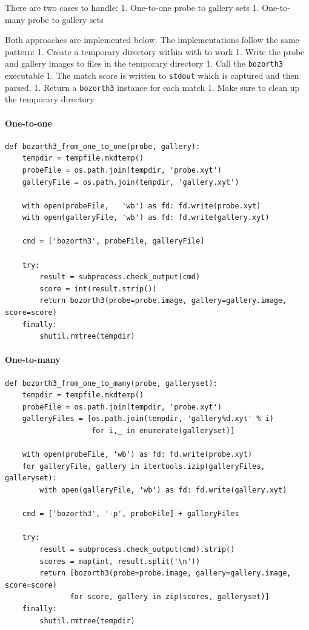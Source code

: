 There are two cases to handle: 1. One-to-one probe to gallery sets 1.
One-to-many probe to gallery sets

Both approaches are implemented below. The implementations follow the
same pattern: 1. Create a temporary directory within with to work 1.
Write the probe and gallery images to files in the temporary directory
1. Call the \texttt{bozorth3} executable 1. The match score is written
to \texttt{stdout} which is captured and then parsed. 1. Return a
\texttt{bozorth3} instance for each match 1. Make sure to clean up the
temporary directory

\paragraph{One-to-one}\label{one-to-one}

\begin{lstlisting}
def bozorth3_from_one_to_one(probe, gallery):
    tempdir = tempfile.mkdtemp()
    probeFile = os.path.join(tempdir, 'probe.xyt')
    galleryFile = os.path.join(tempdir, 'gallery.xyt')

    with open(probeFile,   'wb') as fd: fd.write(probe.xyt)
    with open(galleryFile, 'wb') as fd: fd.write(gallery.xyt)

    cmd = ['bozorth3', probeFile, galleryFile]

    try:
        result = subprocess.check_output(cmd)
        score = int(result.strip())
        return bozorth3(probe=probe.image, gallery=gallery.image, score=score)
    finally:
        shutil.rmtree(tempdir)
\end{lstlisting}

\paragraph{One-to-many}\label{one-to-many}

\begin{lstlisting}
def bozorth3_from_one_to_many(probe, galleryset):
    tempdir = tempfile.mkdtemp()
    probeFile = os.path.join(tempdir, 'probe.xyt')
    galleryFiles = [os.path.join(tempdir, 'gallery%d.xyt' % i)
                    for i,_ in enumerate(galleryset)]

    with open(probeFile, 'wb') as fd: fd.write(probe.xyt)
    for galleryFile, gallery in itertools.izip(galleryFiles, galleryset):
        with open(galleryFile, 'wb') as fd: fd.write(gallery.xyt)

    cmd = ['bozorth3', '-p', probeFile] + galleryFiles

    try:
        result = subprocess.check_output(cmd).strip()
        scores = map(int, result.split('\n'))
        return [bozorth3(probe=probe.image, gallery=gallery.image, score=score)
               for score, gallery in zip(scores, galleryset)]
    finally:
        shutil.rmtree(tempdir)
\end{lstlisting}

